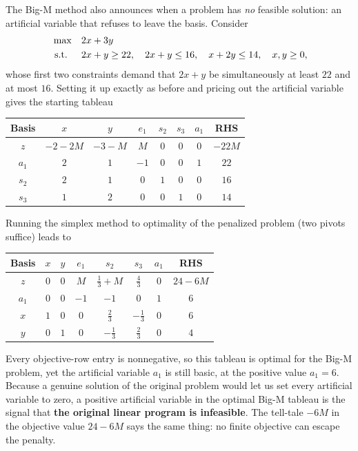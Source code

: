 The Big-M method also announces when a problem has \emph{no} feasible solution: an artificial variable that refuses to leave the basis. Consider
\[
\begin{aligned}
\max\quad & 2x + 3y \\
\mbox{ s.t. }\quad & 2x + y \geq 22,\quad 2x + y \leq 16,\quad x + 2y \leq 14,\quad x,y\ge 0,
\end{aligned}
\]
whose first two constraints demand that $2x+y$ be simultaneously at least $22$ and at most $16$. Setting it up exactly as before and pricing out the artificial variable gives the starting tableau
\begin{center}
\renewcommand{\arraystretch}{1.3}\small\setlength{\tabcolsep}{4.5pt}
\begin{tabular}{c|cccccc|c}
\toprule
Basis & $x$ & $y$ & $e_1$ & $s_2$ & $s_3$ & $a_1$ & RHS\\
\midrule
$z$   & $-2-2M$ & $-3-M$ & $M$ & $0$ & $0$ & $0$ & $-22M$\\
\midrule
$a_1$ & $2$ & $1$ & $-1$ & $0$ & $0$ & $1$ & $22$\\
$s_2$ & $2$ & $1$ & $0$ & $1$ & $0$ & $0$ & $16$\\
$s_3$ & $1$ & $2$ & $0$ & $0$ & $1$ & $0$ & $14$\\
\bottomrule
\end{tabular}
\end{center}
Running the simplex method to optimality of the penalized problem (two pivots suffice) leads to
\begin{center}
\renewcommand{\arraystretch}{1.3}\small\setlength{\tabcolsep}{4.5pt}
\begin{tabular}{c|cccccc|c}
\toprule
Basis & $x$ & $y$ & $e_1$ & $s_2$ & $s_3$ & $a_1$ & RHS\\
\midrule
\rowcolor{algleave!15}$z$ & $0$ & $0$ & $M$ & $\tfrac13+M$ & $\tfrac43$ & $0$ & $24-6M$\\
\midrule
$a_1$ & $0$ & $0$ & $-1$ & $-1$ & $0$ & $1$ & $6$\\
$x$   & $1$ & $0$ & $0$ & $\tfrac23$ & $-\tfrac13$ & $0$ & $6$\\
$y$   & $0$ & $1$ & $0$ & $-\tfrac13$ & $\tfrac23$ & $0$ & $4$\\
\bottomrule
\end{tabular}
\end{center}
Every objective-row entry is nonnegative, so this tableau is optimal for the Big-M problem, yet the artificial variable $a_1$ is still basic, at the positive value $a_1 = 6$. Because a genuine solution of the original problem would let us set every artificial variable to zero, a positive artificial variable in the optimal Big-M tableau is the signal that \textbf{the original linear program is infeasible}. The tell-tale $-6M$ in the objective value $24-6M$ says the same thing: no finite objective can escape the penalty.


